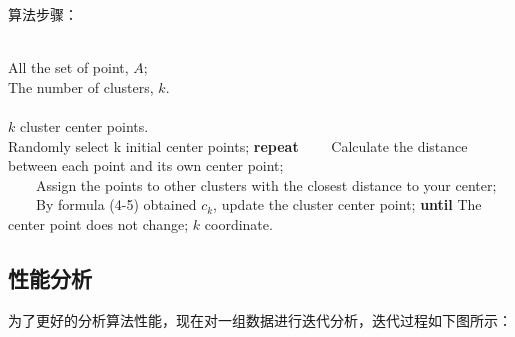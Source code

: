 \documentclass[bachelor,adobefonts]{jnuthesis}
\begin{document}
算法步骤：
\begin{algorithm}[htb]
  \caption{ $K-means$}   
  \label{alg:Framwork}   
  \begin{algorithmic}[1] %
  \REQUIRE ~~\\ %
  All the set of point, $A$;\\  
  The number of clusters, $k$.\\   
  \ENSURE ~~\\ %
  $k$ cluster center points.\\
  \STATE Randomly select k initial center points;    
  \STATE  \textbf{repeat} 
  \STATE \ \ \ \ Calculate the distance between each point and its own center point; \\
  \STATE \ \ \ \ Assign the points to other clusters with the closest distance to your center;
  \STATE \ \ \ \ By formula (4-5) obtained $c_k$, update the cluster center point;
  \STATE  \textbf{until}  The center point does not change;
  \RETURN $k$ coordinate. %
  \end{algorithmic}  
\end{algorithm}  

\subsection{性能分析}
为了更好的分析算法性能，现在对一组数据进行迭代分析，迭代过程如下图所示：
\end{document}
